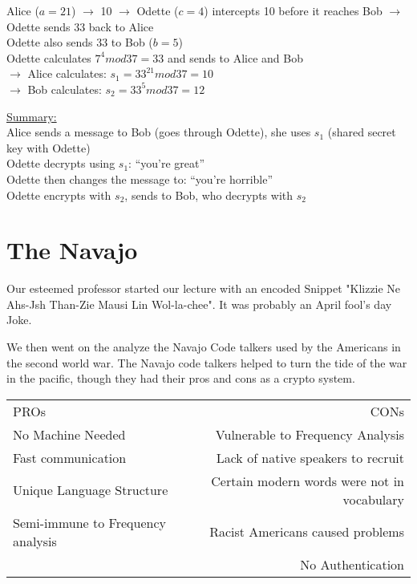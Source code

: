 \begin{example} 
Alice ($a=21$) $\rightarrow$ 10 $\longrightarrow$ Odette ($c=4$) intercepts 10 before it reaches Bob $\longrightarrow$ Odette sends 33 back to Alice \\ Odette also sends 33 to Bob ($b=5$) \\ Odette calculates $7^{4}mod37 = 33$ and sends to Alice and Bob \\ $\longrightarrow$ Alice calculates: $s_1 = 33^{21}mod37 = 10$ \\ $\longrightarrow$ Bob calculates: $s_2 = 33^5mod37 = 12$ \\ \par \underline{Summary:} \\Alice sends a message to Bob (goes through Odette), she uses $s_1$ (shared secret key with Odette) \\Odette decrypts using $s_1$: ``you're great'' \\Odette then changes the message to: ``you're horrible'' \\Odette encrypts with $s_2$, sends to Bob, who decrypts with $s_2$ \end{example} 
      








\section{The Navajo}
Our esteemed professor started our lecture with an encoded Snippet
"Klizzie Ne Ahs-Jsh Than-Zie Mausi Lin Wol-la-chee". It was probably an April fool's day Joke. 

We then went on the analyze the Navajo Code talkers used by the Americans in the second world war. The Navajo code talkers helped to turn the tide of the war in the pacific, though they had their pros and cons as a crypto system.

\begin{tabular}{l || r}
PROs & CONs \\
No Machine Needed & Vulnerable to Frequency Analysis \\
Fast communication & Lack of native speakers to recruit \\
Unique Language Structure & Certain modern words were not in vocabulary \\
Semi-immune to Frequency analysis & Racist Americans caused problems \\
 & No Authentication
\end{tabular}

